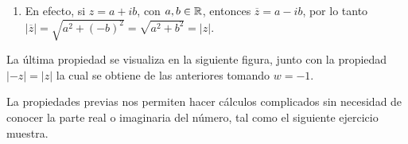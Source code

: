 \begin{enumerate}
\begin{align*}
        |z+w|^2 &= (z+w)(\overline{z+w}) \\
        &= (z+w)(\overline{z} + \overline{w})\\
              &  = |z|^2 + z\overline{w} + w\overline{z} + |w|^2\\
            &= |z|^2 + z\overline{w} + \overline{z\overline{w}} + |w|^2\\
                &= |z|^2 + 2\mbox{Re}(z\overline{w}) + |w|^2\\
            &\le |z|^2 + 2|\mbox{Re}(z\overline{w})| + |w|^2 \\
            &\le |z|^2 + 2|z\overline{w}| + |w|^2\\
            &= |z|^2 + 2|z|\ |\overline{w}| + |w|^2\\
            &= |z|^2 + 2|z|\ |w| + |w|^2\\
            &= \left(|z| + |w|\right)^2.
	\end{align*}
    Dado que se trata de n\'umeros reales no negativos, podemos extraer raíz cuadrada y concluir que:
    $$|z+w| \le |z| + |w|.$$
	\item 	
	En efecto, si $z=a+ib$, con $a,b\in\mathbb{R}$, entonces $\overline{z}=a-ib$, por lo tanto $|\overline{z}|=\sqrt{a^2+(-b)^2}=\sqrt{a^2+b^2}=|z|$.
\end{enumerate}

La última propiedad se visualiza en la siguiente figura, junto con la propiedad $|-z|=|z|$ la cual se obtiene de las anteriores tomando $w=-1$.

\begin{center}
\end{center}

La propiedades previas nos permiten hacer cálculos complicados sin necesidad de conocer la parte real o imaginaria del número, tal como el siguiente ejercicio muestra.

